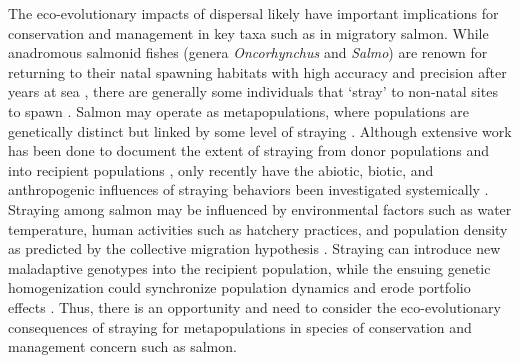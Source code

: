 \documentclass{revtex4}
\begin{document}
The eco-evolutionary impacts of dispersal likely have important implications for conservation and management in key taxa such as in migratory salmon.
While anadromous salmonid fishes (genera \emph{Oncorhynchus} and \emph{Salmo}) are renown for returning to their natal spawning habitats with high accuracy and precision after years at sea \citep{Quinn:2011tf,Jonsson:2011kg,Keefer:2014gg}, there are generally some individuals that `stray' to non-natal sites to spawn \citep{Quinn:1993ge,Hendry:2004wf}.
Salmon may operate as metapopulations, where populations are genetically distinct but linked by some level of straying \citep{Schtickzelle:2007wb,Anderson:2014cx}.
Although extensive work has been done to document the extent of straying from donor populations and into recipient populations \citep{Keefer:2014gg,Bett:2017ha}, only recently have the abiotic, biotic, and anthropogenic influences of straying behaviors been investigated systemically \citep{Keefer:2008bs,Westley:2015to,Bond:2016dz}.
Straying among salmon may be influenced by environmental factors such as water temperature, human activities such as hatchery practices, and population density as predicted by the collective migration hypothesis \citep{Peterson:2014gy}.
Straying can introduce new maladaptive genotypes into the recipient population, while the ensuing genetic homogenization could synchronize population dynamics and erode portfolio effects \citep{Moore:2010gs,Carlson:2011ce,Braun:2016ib}.
Thus, there is an opportunity and need to consider the eco-evolutionary consequences of straying for metapopulations in species of conservation and management concern such as salmon. 

\end{document}
